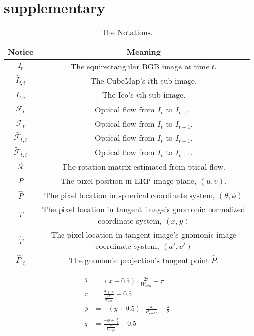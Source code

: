 \section{supplementary}


\begin{table}[h!]
	\begin{center}
		\begin{tabular}{ c | c } 
			\hline
			Notice & Meaning  \\ 
			\hline\hline
			$I_t$          & The equirectangular RGB image at time $t$. \\
			\hline
			$\hat{I}_{t,i}$ & The CubeMap's $i$th sub-image.\\
			\hline
			$\tilde{I}_{t,i}$ & The Ico's $i$th sub-image.\\
			\hline
			$\mathcal{F}_t$ & Optical flow from $I_t$ to $I_{t+1}$. \\
			\hline
			$\bar{\mathcal{F}}_t$ & Optical flow from $I_t$ to $I_{t+1}$. \\
			\hline
			$\hat{\mathcal{F}}_{t,i}$ & Optical flow from $I_t$ to $I_{t+1}$. \\
			\hline
			$\tilde{\mathcal{F}}_{t,i}$ & Optical flow from $I_t$ to $I_{t+1}$. \\
			\hline
			$\mathcal{R}$   & The rotation matrix estimated from ptical flow. \\
			\hline
			$P$            & The pixel position in ERP image plane, $(u,v)$.   \\
			\hline
			$\hat{P}$      & The pixel location in spherical coordinate system, $(\theta, \phi)$ \\
			\hline
			$T$            & The pixel location in tangent image's gnomonic normalized coordinate system, $(x,y)$ \\
			\hline
			$\hat{T}$      & The pixel location in tangent image's gnomonic image coordinate system, $({u}',{v}')$ \\
			\hline
			$\hat{P}'_i$ & The gnomonic projection's tangent point $\hat{P}$. \\
			\hline
		\end{tabular}
	\end{center}
	\caption{The Notations.}
	\label{tab:approach:notation}
\end{table}


\begin{equation}\label{equ:app:sph2erp}
	\begin{split}
		\theta &= (x+0.5) \cdot\frac{2 \pi}{W_{idth}}- \pi
		\\
		x &= \frac{\theta + \pi}{\frac{2\pi}{W_{idth}}} - 0.5
		\\
		\phi&=-(y+0.5) \cdot \frac{\pi}{H_{eight}} + \frac{\pi}{2}
		\\
		y &=\frac{-\phi+\frac{\pi}{2}}{\frac{\pi}{H_{eight}}}-0.5
	\end{split}
\end{equation}

